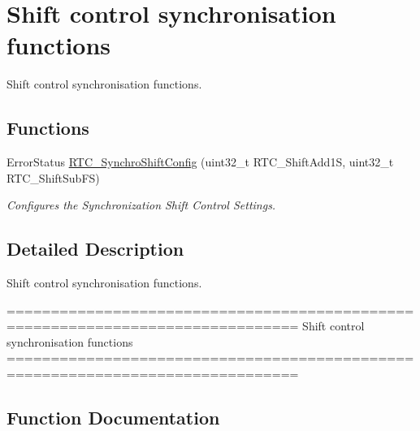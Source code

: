 \hypertarget{group___r_t_c___group12}{}\section{Shift control synchronisation functions}
\label{group___r_t_c___group12}


Shift control synchronisation functions.  


\subsection*{Functions}
\begin{DoxyCompactItemize}
\item 
Error\+Status \hyperlink{group___r_t_c___group12_gaad434ed2a268f05662f0613e8e9717f3}{R\+T\+C\+\_\+\+Synchro\+Shift\+Config} (uint32\+\_\+t R\+T\+C\+\_\+\+Shift\+Add1\+S, uint32\+\_\+t R\+T\+C\+\_\+\+Shift\+Sub\+F\+S)
\begin{DoxyCompactList}\small\item\em Configures the Synchronization Shift Control Settings. \end{DoxyCompactList}\end{DoxyCompactItemize}


\subsection{Detailed Description}
Shift control synchronisation functions. 

\begin{DoxyVerb} ===============================================================================
                   Shift control synchronisation functions
 ===============================================================================  \end{DoxyVerb}
 

\subsection{Function Documentation}
\hypertarget{group___r_t_c___group12_gaad434ed2a268f05662f0613e8e9717f3}{}
